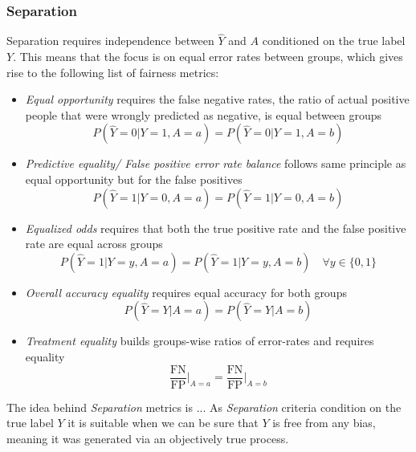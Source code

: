 \subsubsection*{Separation}
Separation requires independence between $\hat{Y}$ and $A$ conditioned on the true label $Y$. This means that the focus is on equal error rates between groups, which gives rise to the following list of fairness metrics:
\begin{itemize}
    \item \textit{Equal opportunity} requires the false negative rates, the ratio of actual positive people that were wrongly predicted as negative, is equal between groups $$P(\hat{Y} = 0 | Y = 1, A = a) = P(\hat{Y} = 0 | Y = 1, A = b)$$
    \item \textit{Predictive equality/ False positive error rate balance} follows same principle as equal opportunity but for the false positives $$P(\hat{Y} = 1 | Y = 0, A = a) = P(\hat{Y} = 1 | Y = 0, A = b)$$
    \item \textit{Equalized odds} requires that both the true positive rate and the false positive rate are equal across groups $$P(\hat{Y} = 1 | Y = y, A = a) = P(\hat{Y} = 1 | Y = y, A = b) \quad \forall y \in \{0, 1\}$$ 
    \item \textit{Overall accuracy equality} requires equal accuracy for both groups $$P(\hat{Y} = Y | A = a) = P(\hat{Y} = Y | A = b)$$ 
    \item \textit{Treatment equality} builds groups-wise ratios of error-rates and requires equality $$\frac{\text{FN}}{\text{FP}} \big|_{A = a} = \frac{\text{FN}}{\text{FP}} \big|_{A = b}$$
\end{itemize}
The idea behind \textit{Separation} metrics is ... As \textit{Separation} criteria condition on the true label $Y$ it is suitable when we can be sure that $Y$ is free from any bias, meaning it was generated via an objectively true process. \\

